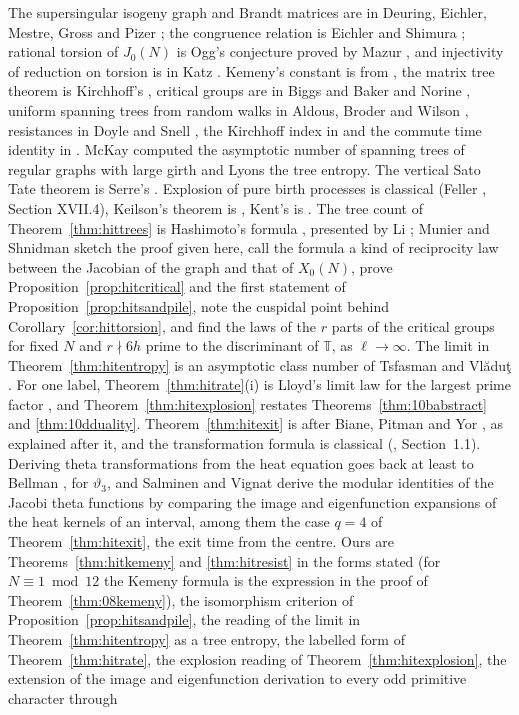 The supersingular isogeny graph and Brandt matrices are in Deuring, Eichler, Mestre, Gross and Pizer \cite{deuring1941,eichler1954,mestre1986,gross1987,pizer1990}; the congruence relation is Eichler and Shimura \cite{shimura1971}; rational torsion of $J_0(N)$ is Ogg's conjecture proved by Mazur \cite{ogg1975,mazur1977}, and injectivity of reduction on torsion is in Katz \cite{katz1981}. Kemeny's constant is from \cite{kemenysnell1960}, the matrix tree theorem is Kirchhoff's \cite{kirchhoff1847}, critical groups are in Biggs \cite{biggs1997} and Baker and Norine \cite{bakernorine2007}, uniform spanning trees from random walks in Aldous, Broder and Wilson \cite{aldous1990,broder1989,wilson1996}, resistances in Doyle and Snell \cite{doylesnell1984}, the Kirchhoff index in \cite{gutmanmohar1996,zhukleinlukovits1996} and the commute time identity in \cite{chandra1996}. McKay \cite{mckay1983} computed the asymptotic number of spanning trees of regular graphs with large girth and Lyons \cite{lyons2005} the tree entropy. The vertical Sato Tate theorem is Serre's \cite{serre1997}. Explosion of pure birth processes is classical (Feller \cite{feller1968}, Section XVII.4), Keilson's theorem is \cite{keilson1971}, Kent's is \cite{kent1980}. The tree count of Theorem~\ref{thm:hittrees} is Hashimoto's formula \cite[(7.14)]{hashimoto1989}, presented by Li \cite[Section~4.3]{li2019}; Munier and Shnidman \cite{muniershnidman2023} sketch the proof given here, call the formula a kind of reciprocity law between the Jacobian of the graph and that of $X_0(N)$, prove Proposition~\ref{prop:hitcritical} and the first statement of Proposition~\ref{prop:hitsandpile}, note the cuspidal point behind Corollary~\ref{cor:hittorsion}, and find the laws of the $r$ parts of the critical groups for fixed $N$ and $r\nmid6h$ prime to the discriminant of $\mathbb T$, as $\ell\to\infty$. The limit in Theorem~\ref{thm:hitentropy} is an asymptotic class number of Tsfasman and Vl\u{a}du\c{t} \cite{tsfasmanvladut2002}. For one label, Theorem~\ref{thm:hitrate}(i) is Lloyd's limit law for the largest prime factor \cite{lloyd1984}, and Theorem~\ref{thm:hitexplosion} restates Theorems~\ref{thm:10babstract} and \ref{thm:10dduality}. Theorem~\ref{thm:hitexit} is after Biane, Pitman and Yor \cite{bpy2001}, as explained after it, and the transformation formula is classical (\cite{bump1997}, Section~1.1). Deriving theta transformations from the heat equation goes back at least to Bellman \cite{bellman1961}, for $\vartheta_3$, and Salminen and Vignat \cite{salminenvignat2024} derive the modular identities of the Jacobi theta functions by comparing the image and eigenfunction expansions of the heat kernels of an interval, among them the case $q=4$ of Theorem~\ref{thm:hitexit}, the exit time from the centre. Ours are Theorems~\ref{thm:hitkemeny} and \ref{thm:hitresist} in the forms stated (for $N\equiv1\bmod12$ the Kemeny formula is the expression in the proof of Theorem~\ref{thm:08kemeny}), the isomorphism criterion of Proposition~\ref{prop:hitsandpile}, the reading of the limit in Theorem~\ref{thm:hitentropy} as a tree entropy, the labelled form of Theorem~\ref{thm:hitrate}, the explosion reading of Theorem~\ref{thm:hitexplosion}, the extension of the image and eigenfunction derivation to every odd primitive character through 